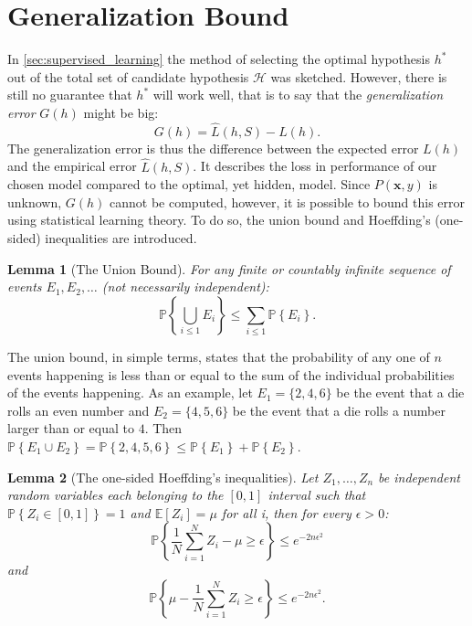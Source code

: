 \documentclass[a4paper, twoside, nobib]{tufte-book}
\newtheorem{lemma}{Lemma}
\renewcommand{\vec}[1]{\mathbf{#1}}
\begin{document}
\section{Generalization Bound}
\label{sec:generalization_bound}
In \autoref{sec:supervised_learning} the method of selecting the optimal hypothesis $h^*$ out of the total set of candidate hypothesis $\mathcal{H}$ was sketched. However, there is still no guarantee that $h^*$ will work well, that is to say that the \emph{generalization error} $G(h)$ might be big:
\begin{equation}
  G(h) = \hat{L}(h, S) - L(h).
\end{equation}
The generalization error is thus the difference between the expected error $L(h)$ and the empirical error $\hat{L}(h, S)$. It describes the loss in performance of our chosen model compared to the optimal, yet hidden, model. Since $P(\vec{x}, y)$ is unknown, $G(h)$ cannot be computed, however, it is possible to bound this error using statistical learning theory. To do so, the union bound and Hoeffding's (one-sided) inequalities are introduced. 
\begin{lemma}[The Union Bound]
  For any finite or countably infinite sequence of events $E_1, E_2, \dots$ (not necessarily independent): 
  \begin{equation}
    \mathbb{P} \left\{\bigcup_{i \leq 1} E_i \right\} \leq \sum_{i \leq 1} \mathbb{P} \left\{E_i \right \}. 
  \end{equation}
\end{lemma}
The union bound, in simple terms, states that the probability of any one of $n$ events happening is less than or equal to the sum of the individual probabilities of the events happening. As an example, let $E_1=\{2, 4, 6\}$ be the event that a die rolls an even number and $E_2=\{4, 5, 6\}$ be the event that a die rolls a number larger than or equal to $4$. Then $\mathbb{P} \left\{E_1 \cup E_2 \right\} = \mathbb{P} \left\{ 2, 4, 5, 6 \right\} \leq \mathbb{P} \left\{E_1 \right \} + \mathbb{P} \left\{E_2 \right \} $. 
\begin{lemma}[The one-sided Hoeffding's inequalities]
  Let $Z_1, \dots, Z_n$ be independent random variables each belonging to the $[0, 1]$ interval such that $\mathbb{P}\left\{Z_i \in [0, 1] \right\} = 1$ and $\mathbb{E}[Z_i] = \mu$ for all i, then for every $\epsilon > 0$:
  \begin{equation}
    \mathbb{P} \left\{  \frac{1}{N}\sum_{i=1}^N Z_i - \mu \geq \epsilon \right\} \leq e^{-2n\epsilon^2} 
    \label{eq:hoeffding_onesided_a}
  \end{equation}
  and
  \begin{equation}
    \mathbb{P} \left\{ \mu - \frac{1}{N}\sum_{i=1}^N Z_i  \geq \epsilon \right\} \leq e^{-2n\epsilon^2}.
    \label{eq:hoeffding_onesided_b}
  \end{equation}
\end{lemma}
\end{document}
